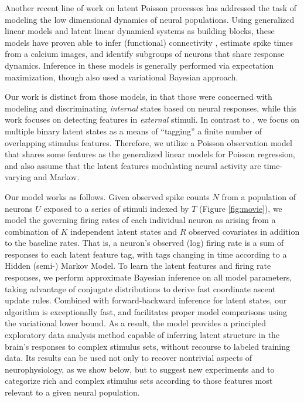 \documentclass{nature}
\begin{document}
Another recent line of work on latent Poisson processes has addressed the task of modeling the low dimensional dynamics of neural populations\cite{Pillow2008-em,Vogelstein2009-ax,Park2014-el,Buesing2014-ta,Archer2015-ec, Zhao2016-bw,Gao2016-ck}. Using generalized linear models and latent linear dynamical systems as building blocks, these models have proven able to infer (functional) connectivity \cite{Pillow2008-em}, estimate spike times from a calcium images\cite{Vogelstein2009-ax}, and identify subgroups of neurons that share response dynamics\cite{Buesing2014-ta,Zhao2016-bw,Gao2016-ck}. Inference in these models is generally performed via expectation maximization, though \cite{Ulrich2014-zc,Putzky2014-up,Archer2015-ec, Zhao2016-bw,Gao2016-ck} also used a variational Bayesian approach.

Our work is distinct from those models, in that those were concerned with modeling and discriminating \emph{internal} states based on neural responses, while this work focuses on detecting features in \emph{external} stimuli. In contrast to \cite{Buesing2014-ta,Archer2015-ec,Zhao2016-bw,Gao2016-ck}, we focus on multiple binary latent states as a means of ``tagging'' a finite number of overlapping stimulus features. Therefore, we utilize a Poisson observation model that shares some features as the generalized linear models for Poisson regression, and also assume that the latent features modulating neural activity are time-varying and Markov.

Our model works as follows. Given observed spike counts $N$ from a population of neurons $U$ exposed to a series of stimuli indexed by $T$ (Figure \ref{fig:movie}), we model the governing firing rates of each individual neuron as arising from a combination of $K$ independent latent states and $R$ observed covariates in addition to the baseline rates. That is, a neuron's observed (log) firing rate is a sum of responses to each latent feature tag, with tags changing in time according to a Hidden (semi-) Markov Model. To learn the latent features and firing rate responses, we perform approximate Bayesian inference on all model parameters, taking advantage of conjugate distributions to derive fast coordinate ascent update rules. Combined with forward-backward inference for latent states, our algorithm is exceptionally fast, and facilitates proper model comparisons using the variational lower bound. As a result, the model provides a principled exploratory data analysis method capable of inferring latent structure in the brain's responses to complex stimulus sets, without recourse to labeled training data. Its results can be used not only to recover nontrivial aspects of neurophysiology, as we show below, but to suggest new experiments and to categorize rich and complex stimulus sets according to those features most relevant to a given neural population.
\end{document}
